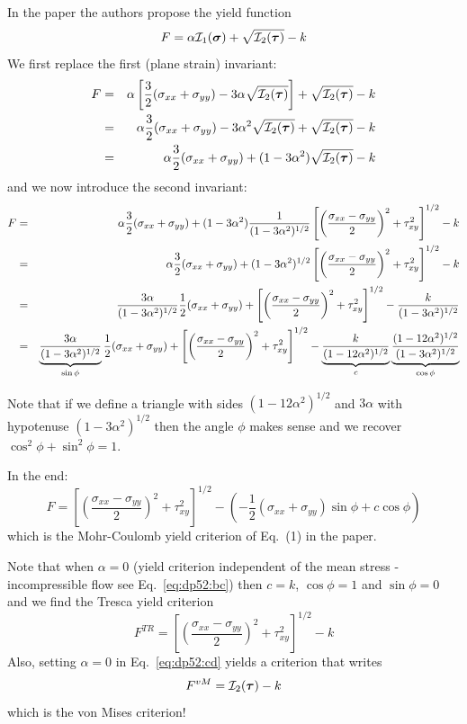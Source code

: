 In the paper the authors propose the yield function 
\[
F = \alpha {\cal I}_1(\bm\sigma) + \sqrt{{\cal I}_2(\bm\tau)} - k
\]
We first replace the first (plane strain) invariant:
\begin{eqnarray}
F 
&=& \alpha \left[ \frac32(\sigma_{xx}+\sigma_{yy})- 3 \alpha \sqrt{{\cal I}_2(\bm\tau)} \right]
+ \sqrt{{\cal I}_2(\bm\tau)} - k \nonumber\\
&=&\alpha \frac32(\sigma_{xx}+\sigma_{yy})- 3 \alpha^2 \sqrt{{\cal I}_2(\bm\tau)}
+ \sqrt{{\cal I}_2(\bm\tau)} - k  \nonumber\\
&=&\alpha \frac32(\sigma_{xx}+\sigma_{yy}) +(1- 3 \alpha^2) \sqrt{{\cal I}_2(\bm\tau)} - k \nonumber
\end{eqnarray}
and we now introduce the second invariant:
\begin{eqnarray}
F &=& 
\alpha \frac32(\sigma_{xx}+\sigma_{yy}) +(1- 3 \alpha^2)
\frac{1}{(1 -3\alpha^2)^{1/2}} \left[\left(\frac{\sigma_{xx}-\sigma_{yy}}{2} \right)^2 
+ \tau_{xy}^2 \right]^{1/2} -  k  \nonumber\\
&=& \alpha \frac32(\sigma_{xx}+\sigma_{yy}) +(1- 3 \alpha^2)^{1/2}
\left[\left(\frac{\sigma_{xx}-\sigma_{yy}}{2} \right)^2 + \tau_{xy}^2 \right]^{1/2} 
- k  \nonumber\\
&=&\frac{3\alpha}{(1- 3 \alpha^2)^{1/2}}
\frac12(\sigma_{xx}+\sigma_{yy}) +
\left[\left(\frac{\sigma_{xx}-\sigma_{yy}}{2} \right)^2 + \tau_{xy}^2 \right]^{1/2} 
- \frac{k}{(1- 3 \alpha^2)^{1/2}} 
\nonumber\\
&=&\underbrace{\frac{3\alpha}{(1- 3 \alpha^2)^{1/2}}}_{\sin\phi}
\frac12(\sigma_{xx}+\sigma_{yy}) +
\left[\left(\frac{\sigma_{xx}-\sigma_{yy}}{2} \right)^2 + \tau_{xy}^2 \right]^{1/2} 
- \underbrace{\frac{k}{(1- 12 \alpha^2)^{1/2}}}_{c}
\underbrace{\frac{(1- 12 \alpha^2)^{1/2}}{(1- 3 \alpha^2)^{1/2}}}_{\cos\phi}
\end{eqnarray}


Note that if we define a triangle with sides $(1- 12 \alpha^2)^{1/2}$ and $3\alpha$
with hypotenuse $(1- 3 \alpha^2)^{1/2}$ then the angle $\phi$ makes sense and
we recover $\cos^2\phi+\sin^2\phi=1$.

In the end:
\[
F = 
\left[\left(\frac{\sigma_{xx}-\sigma_{yy}}{2} \right)^2 + \tau_{xy}^2 \right]^{1/2}
-\left(-\frac12(\sigma_{xx}+\sigma_{yy}) \sin \phi + c \cos \phi \right)
\]
which is the Mohr-Coulomb yield criterion of Eq.~(1) in the paper.


Note that when $\alpha=0$ (yield criterion independent of the mean stress - incompressible flow see Eq.~\eqref{eq:dp52:bc}) then $c=k$, $\cos\phi=1$ and $\sin\phi=0$ and we find 
the Tresca yield criterion
\[
F^{TR}=  \left[\left(\frac{\sigma_{xx}-\sigma_{yy}}{2} \right)^2 + \tau_{xy}^2 \right]^{1/2} - k
\]
Also, setting $\alpha=0$ in Eq.~\eqref{eq:dp52:cd} yields a criterion that writes
\[
F^{vM}={\cal I}_2(\bm\tau) - k
\]
which is the von Mises criterion! 



